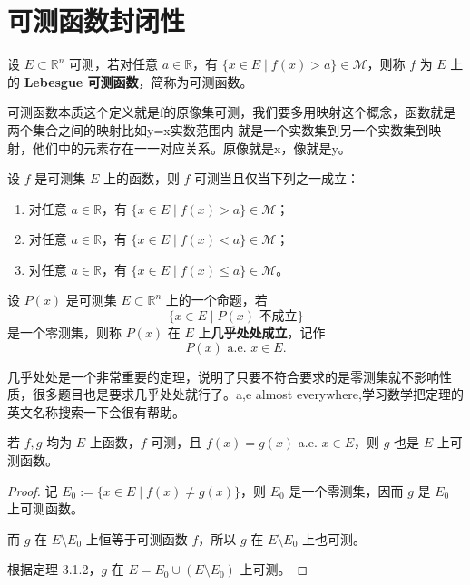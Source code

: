 \documentclass[lang=cn,10pt]{elegantbook}
\begin{document}
\section{可测函数封闭性}
\begin{definition}
设 $E \subset \mathbb{R}^n$ 可测，若对任意 $a \in \mathbb{R}$，有 $\{x \in E \mid f(x) > a\} \in \mathcal{M}$，则称 $f$ 为 $E$ 上的 \textbf{Lebesgue 可测函数}，简称为可测函数。
\end{definition}
可测函数本质这个定义就是f的原像集可测，我们要多用映射这个概念，函数就是两个集合之间的映射比如y=x实数范围内 就是一个实数集到另一个实数集到映射，他们中的元素存在一一对应关系。原像就是x，像就是y。
\begin{theorem}[可测函数的等价表述]
设 $f$ 是可测集 $E$ 上的函数，则 $f$ 可测当且仅当下列之一成立：
\begin{enumerate}
  \item 对任意 $a \in \mathbb{R}$，有 $\{x \in E \mid f(x) > a\} \in \mathcal{M}$；
  \item 对任意 $a \in \mathbb{R}$，有 $\{x \in E \mid f(x) < a\} \in \mathcal{M}$；
  \item 对任意 $a \in \mathbb{R}$，有 $\{x \in E \mid f(x) \leq a\} \in \mathcal{M}$。
\end{enumerate}
\end{theorem}
\begin{definition}
设 $P(x)$ 是可测集 $E \subset \mathbb{R}^n$ 上的一个命题，若
\[
\{x \in E \mid P(x) \text{ 不成立} \}
\]
是一个零测集，则称 $P(x)$ 在 $E$ 上\textbf{几乎处处成立}，记作
\[
P(x) \text{ a.e. } x \in E.
\]
\end{definition}

几乎处处是一个非常重要的定理，说明了只要不符合要求的是零测集就不影响性质，很多题目也是要求几乎处处就行了。a,e almost everywhere,学习数学把定理的英文名称搜索一下会很有帮助。

\begin{theorem}[几乎处处相等的函数具有相同的可测性]
若 $f, g$ 均为 $E$ 上函数，$f$ 可测，且 $f(x) = g(x)$ a.e. $x \in E$，则 $g$ 也是 $E$ 上可测函数。
\end{theorem}

\begin{proof}
记 $E_0 := \{x \in E \mid f(x) \neq g(x)\}$，则 $E_0$ 是一个零测集，因而 $g$ 是 $E_0$ 上可测函数。

而 $g$ 在 $E \setminus E_0$ 上恒等于可测函数 $f$，所以 $g$ 在 $E \setminus E_0$ 上也可测。

根据定理 3.1.2，$g$ 在 $E = E_0 \cup (E \setminus E_0)$ 上可测。
\end{proof}
\end{document}
